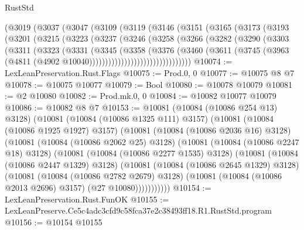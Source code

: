 \begin{lexlean}{RustStd}
\begin{coremodule}
    (@3019
      (@3037
        (@3047
          (@3109
            (@3119
              (@3146
                (@3151
                  (@3165
                    (@3173
                      (@3193
                        (@3201
                          (@3215
                            (@3223
                              (@3237
                                (@3246
                                  (@3258
                                    (@3266
                                      (@3282
                                        (@3290
                                          (@3303
                                            (@3311
                                              (@3323
                                                (@3331
                                                  (@3345
                                                    (@3358
                                                      (@3376
                                                        (@3460
                                                          (@3611
                                                            (@3745
                                                              (@3963
                                                                (@4811
                                                                  (@4902
                                                                    @10040))))))))))))))))))))))))))))))))
@10074 := LexLeanPreservation.Rust.Flags
@10075 := Prod.{0, 0}
@10077 := @10075 @8 @7
@10078 := @10075 @10077
@10079 := Bool
@10080 := @10078 @10079
@10081 := @2 @10080
@10082 := Prod.mk.{0, 0}
@10084 := @10082 @10077 @10079
@10086 := @10082 @8 @7
@10153 := @10081
    (@10084 (@10086 @254 @13) @3128)
    (@10081
      (@10084 (@10086 @1325 @111) @3157)
      (@10081
        (@10084 (@10086 @1925 @1927) @3157)
        (@10081
          (@10084 (@10086 @2036 @16) @3128)
          (@10081
            (@10084 (@10086 @2062 @25) @3128)
            (@10081
              (@10084 (@10086 @2247 @18) @3128)
              (@10081
                (@10084 (@10086 @2277 @1535) @3128)
                (@10081
                  (@10084 (@10086 @2447 @1329) @3128)
                  (@10081
                    (@10084 (@10086 @2645 @1329) @3128)
                    (@10081
                      (@10084 (@10086 @2782 @2679) @3128)
                      (@10081 (@10084 (@10086 @2013 @2696) @3157) (@27 @10080)))))))))))
@10154 := LexLeanPreservation.Rust.FunOK
@10155 := LexLeanPreserve.Ce5c4adc3cfd9c58fca37e2c38493ff18.R1.RustStd.program
@10156 := @10154 @10155

\end{coremodule}
\end{lexlean}
